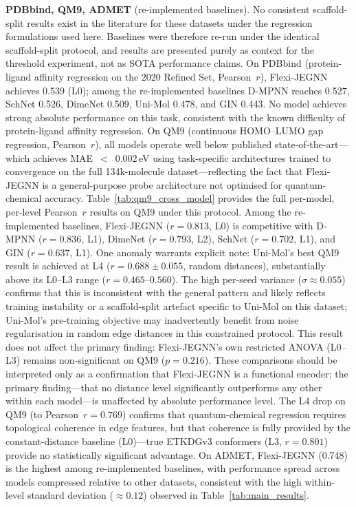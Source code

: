\documentclass[pdflatex,sn-vancouver-num]{sn-jnl}%
\theoremstyle{thmstyleone}%
\theoremstyle{thmstyletwo}%
\theoremstyle{thmstylethree}%
\begin{document}
\textbf{PDBbind, QM9, ADMET} (re-implemented baselines).  No consistent
scaffold-split results exist in the literature for these datasets under
the regression formulations used here.
Baselines were therefore re-run under the identical scaffold-split
protocol, and results are presented purely as context for the
threshold experiment, not as SOTA performance claims.
On PDBbind (protein-ligand affinity regression on the 2020 Refined Set, Pearson~$r$),
Flexi-JEGNN achieves 0.539 (L0); among the re-implemented baselines
D-MPNN reaches 0.527, SchNet 0.526, DimeNet 0.509, Uni-Mol 0.478,
and GIN 0.443.  No model achieves strong absolute performance on this
task, consistent with the known difficulty of protein-ligand affinity
regression.  On QM9
(continuous HOMO--LUMO gap regression, Pearson~$r$), all models
operate well below published state-of-the-art---which achieves
MAE~$<$~0.002\,eV using task-specific architectures trained to
convergence on the full 134k-molecule dataset---reflecting the
fact that Flexi-JEGNN is a general-purpose probe architecture
not optimised for quantum-chemical accuracy.
Table~\ref{tab:qm9_cross_model} provides the full per-model, per-level
Pearson~$r$ results on QM9 under this protocol.  Among the re-implemented
baselines, Flexi-JEGNN ($r = 0.813$, L0) is competitive with D-MPNN
($r = 0.836$, L1), DimeNet ($r = 0.793$, L2), SchNet ($r = 0.702$, L1),
and GIN ($r = 0.637$, L1).  One anomaly warrants explicit note: Uni-Mol's
best QM9 result is achieved at L4 ($r = 0.688 \pm 0.055$, random distances),
substantially above its L0--L3 range ($r = 0.465$--$0.560$).  The high per-seed
variance ($\sigma \approx 0.055$) confirms that this is inconsistent with the
general pattern and likely reflects training instability or a scaffold-split artefact specific to Uni-Mol on this
dataset; Uni-Mol's pre-training objective may inadvertently benefit from
noise regularisation in random edge distances in this constrained protocol.
This result does not affect the primary finding: Flexi-JEGNN's own
restricted ANOVA (L0--L3) remains non-significant on QM9 ($p = 0.216$).
These comparisons should be interpreted only as a
confirmation that Flexi-JEGNN is a functional encoder; the primary
finding---that no distance level significantly outperforms any other
within each model---is unaffected by absolute performance level.
The L4 drop on QM9 (to Pearson~$r = 0.769$)
confirms that quantum-chemical regression requires topological coherence
in edge features, but that coherence is fully provided by the constant-distance
baseline (L0)---true ETKDGv3 conformers (L3, $r = 0.801$) provide no statistically
significant advantage.  On ADMET, Flexi-JEGNN (0.748) is the highest
among re-implemented baselines, with performance spread across models
compressed relative to other datasets, consistent with the high
within-level standard deviation ($\approx 0.12$) observed in
Table~\ref{tab:main_results}.
\end{document}
